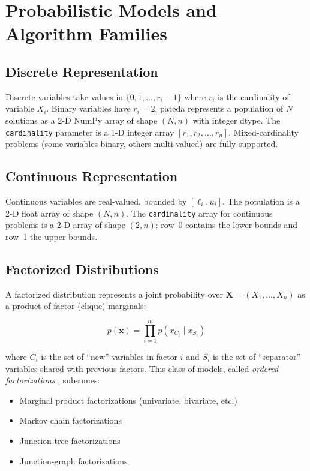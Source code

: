 \documentclass[a4paper,11pt]{article}
\begin{document}
\section{Probabilistic Models and Algorithm Families}
\label{sec:models}

\subsection{Discrete Representation}

Discrete variables take values in $\{0, 1, \ldots, r_i - 1\}$ where $r_i$ is
the cardinality of variable $X_i$.  Binary variables have $r_i = 2$.  pateda
represents a population of $N$ solutions as a 2-D NumPy array of shape
$(N, n)$ with integer dtype.  The \texttt{cardinality} parameter is a 1-D
integer array $[r_1, r_2, \ldots, r_n]$.  Mixed-cardinality problems (some
variables binary, others multi-valued) are fully supported.

\subsection{Continuous Representation}

Continuous variables are real-valued, bounded by
$[\ell_i, u_i]$.  The population is a 2-D float array of shape $(N, n)$.
The \texttt{cardinality} array for continuous problems is a 2-D array of
shape $(2, n)$: row~0 contains the lower bounds and row~1 the upper bounds.

\subsection{Factorized Distributions}
\label{sec:factorized}

A factorized distribution \citep{Muhlenbein_et_al:1999,Harik:1999} represents
a joint probability over $\mathbf{X} = (X_1, \ldots, X_n)$ as a product of
factor (clique) marginals:

\begin{equation}
  p(\mathbf{x}) = \prod_{i=1}^{m} p(x_{C_i} \mid x_{S_i})
\end{equation}

where $C_i$ is the set of ``new'' variables in factor $i$ and $S_i$ is the
set of ``separator'' variables shared with previous factors.  This class of
models, called \emph{ordered factorizations} \citep{Santana:2005}, subsumes:
\begin{itemize}
  \item Marginal product factorizations (univariate, bivariate, etc.)
  \item Markov chain factorizations
  \item Junction-tree factorizations
  \item Junction-graph factorizations \citep{Santana_et_al:2008a}
\end{itemize}
\end{document}
